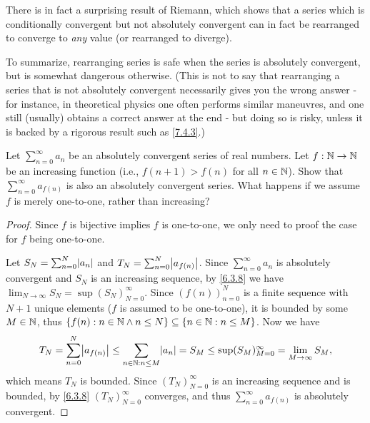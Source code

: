 \begin{note}
  There is in fact a surprising result of Riemann, which shows that a series which is conditionally convergent but not absolutely convergent can in fact be rearranged to converge to \emph{any} value
  (or rearranged to diverge).
\end{note}

\begin{note}
  To summarize, rearranging series is safe when the series is absolutely convergent, but is somewhat dangerous otherwise.
  (This is not to say that rearranging a series that is not absolutely convergent necessarily gives you the wrong answer
  - for instance, in theoretical physics one often performs similar maneuvres, and one still (usually) obtains a correct answer at the end
  - but doing so is risky, unless it is backed by a rigorous result such as \cref{7.4.3}.)
\end{note}

\exercisesection

\begin{ex}\label{ex:7.4.1}
  Let \(\sum_{n = 0}^\infty a_n\) be an absolutely convergent series of real numbers.
  Let \(f : \mathbb{N} \to \mathbb{N}\) be an increasing function (i.e., \(f(n + 1) > f(n)\) for all \(n \in \mathbb{N}\)).
  Show that \(\sum_{n = 0}^\infty a_{f(n)}\) is also an absolutely convergent series.
  What happens if we assume \(f\) is merely one-to-one, rather than increasing?
\end{ex}

\begin{proof}
  Since \(f\) is bijective implies \(f\) is one-to-one, we only need to proof the case for \(f\) being one-to-one.

  Let \(S_N = \sum_{n = 0}^N \abs{a_n}\) and \(T_N = \sum_{n = 0}^N \abs{a_{f(n)}}\).
  Since \(\sum_{n = 0}^\infty a_n\) is absolutely convergent and \(S_N\) is an increasing sequence, by \cref{6.3.8} we have \(\lim_{N \to \infty} S_N = \sup(S_N)_{N = 0}^\infty\).
  Since \((f(n))_{n = 0}^N\) is a finite sequence with \(N + 1\) unique elements (\(f\) is assumed to be one-to-one), it is bounded by some \(M \in \mathbb{N}\), thus \(\{f(n) : n \in \mathbb{N} \land n \leq N\} \subseteq \{n \in \mathbb{N} : n \leq M\}\).
  Now we have
  \[
    T_N = \sum_{n = 0}^N \abs{a_{f(n)}} \leq \sum_{n \in \N : n \leq M} \abs{a_n} = S_M \leq \sup(S_M)_{M = 0}^\infty = \lim_{M \to \infty} S_M,
  \]
  which means \(T_N\) is bounded.
  Since \((T_N)_{N = 0}^\infty\) is an increasing sequence and is bounded, by \cref{6.3.8} \((T_N)_{N = 0}^\infty\) converges, and thus \(\sum_{n = 0}^\infty a_{f(n)}\) is absolutely convergent.
\end{proof}

